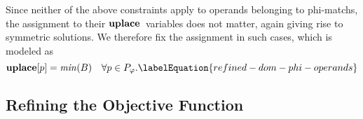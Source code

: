 Since neither of the above \glspl{constraint} apply to \glspl{operand} belonging
to \glspl{phi-match}, the assignment to their $\mVar{uplace}$~\glspl{variable}
does not matter, again giving rise to symmetric \glspl{solution}.
%
We therefore fix the assignment in such cases, which is modeled as
%
\begin{equation}
  \mVar{uplace}[p] = \mMin(\mBlockSet)
  \mQuantSep
  \forall p \in \mPhiOperandSet.
  \labelEquation{refined-dom-phi-operands}
\end{equation}


\subsection{Refining the Objective Function}

